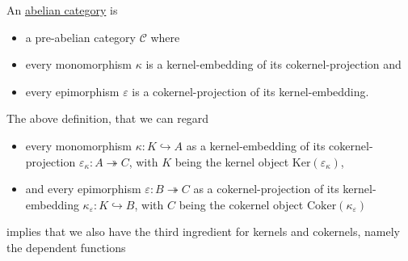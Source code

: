 \begin{definition}\label{def:abelian_category}
An \ul{abelian category} is
\begin{itemize}
\item a pre-abelian category $\mathcal{C}$ where
\item every monomorphism $\kappa$ is a kernel-embedding of its cokernel-projection and
\item every epimorphism $\varepsilon$ is a cokernel-projection of  its kernel-embedding.
\end{itemize}
\end{definition}

The above definition, that we can regard
\begin{itemize}
\item every monomorphism $\kappa : K \hookrightarrow A$ as a kernel-embedding
of its cokernel-projection $\varepsilon_{\kappa} : A \twoheadrightarrow C$, with $K$ being the kernel object
$\mathrm{Ker}(\varepsilon_{\kappa})$,
\item and every epimorphism
$\varepsilon : B \twoheadrightarrow C$ as a cokernel-projection of its kernel-embedding $\kappa_{\varepsilon} : K \hookrightarrow B$,
with $C$ being the cokernel object $\mathrm{Coker}(\kappa_{\varepsilon})$
\end{itemize}
implies that we also have the third ingredient
for kernels and cokernels, namely the dependent functions
